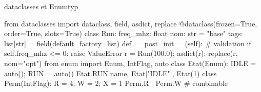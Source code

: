 \documentclass{article}
\begin{document}
\begin{colonne}[objets][col-c]
\begin{bloc}{dataclasses et Enum}{typ}
\begin{code}
from dataclasses import dataclass, field, asdict, replace
@dataclass(frozen=True, order=True, slots=True)
class Run:
    freq_mhz: float
    nom: str = "base"
    tags: list[str] = field(default_factory=list)
    def __post_init__(self):  # validation
        if self.freq_mhz <= 0: raise ValueError
r = Run(100.0); asdict(r); replace(r, nom="opt")
from enum import Enum, IntFlag, auto
class Etat(Enum):
    IDLE = auto(); RUN = auto()
Etat.RUN.name, Etat["IDLE"], Etat(1)
class Perm(IntFlag):
    R = 4; W = 2; X = 1
Perm.R | Perm.W               # combinable
\end{code}
\end{bloc}
\end{colonne}
\end{document}
